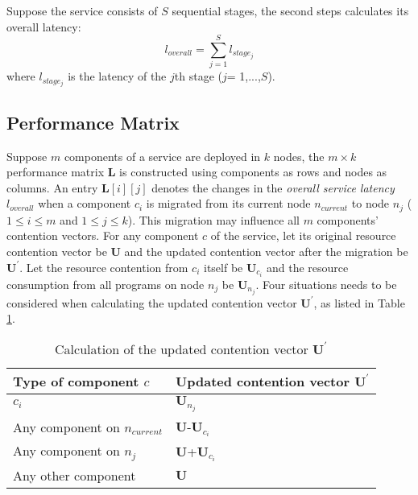 \documentclass[10pt, conference, compsocconf]{IEEEtran}
\begin{document}
Suppose the service consists of $S$ sequential stages, the second steps calculates its overall latency:
\begin{equation}
l_{overall}= \sum_{j=1}^S l_{stage_{j}}
\label{Equation: the overall response time}
\end{equation}
where $l_{stage_j}$ is the latency of the $j$th stage ($j$= 1,...,$S$).
 
\subsection{Performance Matrix} \label{Section: Matrix Construction}

Suppose $m$ components of a service are deployed in $k$ nodes, the $m \times k$ performance matrix $\textbf{L}$ is constructed using components as rows and nodes as columns. An entry $\textbf{L}[i][j]$ denotes the changes in the \emph{overall service latency} $l_{overall}$ when a component $c_{i}$ is migrated from its current node $n_{current}$ to node $n_{j}$ ($1 \leq i \leq m$ and $1 \leq j \leq k$). This migration may influence all $m$ components' contention vectors. For any component $c$ of the service, let its original resource contention vector be $\textbf{U}$ and the updated contention vector after the migration be $\textbf{U}^{'}$. Let the resource contention from $c_{i}$ itself be $\textbf{U}_{c_{i}}$ and the resource consumption from all programs on node $n_j$ be $\textbf{U}_{n_{j}}$.  Four situations needs to be considered when calculating the updated contention vector $\textbf{U}^{'}$, as listed in Table \ref{table: Updated usage vectors in migration}.

\begin{table}[h!]
  \caption{Calculation of the updated contention vector $\textbf{U}^{'}$}
  \centering
  \begin{tabular}{|l|l|}
    \hline
    \textbf{Type of component $c$} & \textbf{Updated contention vector $\textbf{U}^{'}$} \\
    \hline
    $c_{i}$& $\textbf{U}_{n_{j}}$\\
    \hline
    Any component on $n_{current}$ & $\textbf{U}$-$\textbf{U}_{c_{i}}$\\
    \hline
    Any component on $n_{j}$ & $\textbf{U}$+$\textbf{U}_{c_{i}}$\\
    \hline
    Any other component & $\textbf{U}$\\
    \hline
  \end{tabular}
  \label{table: Updated usage vectors in migration}
\end{table}
\end{document}
